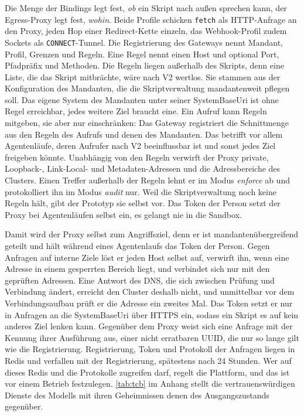 Die Menge der Bindings legt fest, \emph{ob} ein Skript nach außen sprechen kann, der Egress-Proxy legt fest, \emph{wohin}.
Beide Profile schicken \texttt{fetch} als \ac{HTTP}-Anfrage an den Proxy, jeden Hop einer
Redirect-Kette einzeln, das Webhook-Profil zudem Sockets als \texttt{CONNECT}-Tunnel. Die Registrierung des Gateways nennt Mandant, Profil, Grenzen und Regeln. Eine Regel nennt einen
Host und optional Port, Pfadpräfix und Methoden. Die Regeln liegen außerhalb des Skripts, denn eine Liste, die das Skript mitbrächte, wäre nach V2 wertlos. Sie stammen
aus der Konfiguration des Mandanten, die die Skriptverwaltung mandantenweit pflegen soll. Das eigene System des Mandanten
unter seiner SystemBaseUri ist ohne Regel erreichbar, jedes weitere Ziel braucht eine. Ein Aufruf kann Regeln mitgeben,
sie aber nur einschränken: Das Gateway registriert die Schnittmenge aus den Regeln des Aufrufs und denen des Mandanten. Das
betrifft vor allem Agentenläufe, deren Aufrufer nach V2 beeinflussbar ist und sonst jedes Ziel freigeben könnte. Unabhängig von den Regeln verwirft der Proxy private, Loopback-,
Link-Local- und Metadaten-Adressen und die Adressbereiche des Clusters. Einen Treffer außerhalb der Regeln lehnt er im
Modus \emph{enforce} ab und protokolliert ihn im Modus \emph{audit} nur. Weil die Skriptverwaltung noch keine Regeln
hält, gibt der Prototyp sie selbst vor. Das Token der Person setzt der Proxy bei Agentenläufen selbst ein, es gelangt
nie in die Sandbox.

Damit wird der Proxy selbst zum Angriffsziel, denn er ist mandantenübergreifend geteilt und hält während eines
Agentenlaufs das Token der Person. Gegen Anfragen auf interne Ziele löst er jeden Host selbst auf, verwirft ihn, wenn
eine Adresse in einem gesperrten Bereich liegt, und verbindet sich nur mit den geprüften Adressen. Eine Antwort des \ac{DNS},
die sich zwischen Prüfung und Verbindung ändert, erreicht den Cluster deshalb nicht, und unmittelbar vor dem
Verbindungsaufbau prüft er die Adresse ein zweites Mal. Das Token setzt er nur in Anfragen an die SystemBaseUri über
\ac{HTTPS} ein, sodass ein Skript es auf kein anderes Ziel lenken kann. Gegenüber dem Proxy weist sich eine Anfrage mit
der Kennung ihrer Ausführung aus, einer nicht erratbaren \ac{UUID}, die nur so lange gilt wie die Registrierung.
Registrierung, Token und Protokoll der Anfragen liegen in Redis und verfallen mit der Registrierung, spätestens nach
24 Stunden. Wer auf dieses Redis und die Protokolle zugreifen darf, regelt die Plattform, und das ist vor einem Betrieb
festzulegen. \autoref{tab:tcb} im Anhang stellt die vertrauenswürdigen Dienste des Modells mit ihren Geheimnissen denen
des Ausgangszustands gegenüber.

